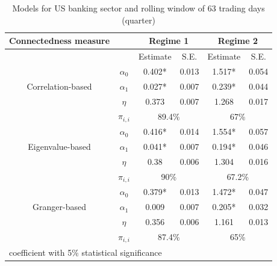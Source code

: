 \documentclass{article}
\begin{document}
\begin{table}
  \caption{Models for US banking sector and rolling window of 63 trading days (quarter)}
  \begin{tabular}{cccccc}
    \toprule
     Connectedness measure &  & \multicolumn{2}{c}{\bfseries Regime 1} & \multicolumn{2}{c}{\bfseries Regime 2}  \\
     \hline
     & & Estimate & S.E. & Estimate & S.E. \\
     \hline
     \multirow{3}{*}[\normalbaselineskip]{Correlation-based} & $\alpha_0$ & 0.402* & 0.013 & 1.517*  & 0.054 \\
      & $\alpha_1$ & 0.027* & 0.007 & 0.239* & 0.044 \\
      & $\eta$ & 0.373 & 0.007 & 1.268 & 0.017 \\
      & $\pi_{i,i}$ &  \multicolumn{2}{c}{89.4\%} & \multicolumn{2}{c}{67\%}\\
      \hline
      \multirow{3}{*}[\normalbaselineskip]{Eigenvalue-based} & $\alpha_0$ & 0.416* & 0.014 & 1.554*  & 0.057 \\
      & $\alpha_1$ & 0.041* & 0.007 & 0.194* & 0.046 \\
      & $\eta$ & 0.38 & 0.006 & 1.304 & 0.016 \\
      & $\pi_{i,i}$ &  \multicolumn{2}{c}{90\%} & \multicolumn{2}{c}{67.2\%}\\
      \hline
      \multirow{3}{*}[\normalbaselineskip]{Granger-based} & $\alpha_0$ & 0.379* & 0.013 & 1.472*  & 0.047 \\
      & $\alpha_1$ & 0.009 & 0.007 & 0.205* & 0.032 \\
      & $\eta$ & 0.356 & 0.006 & 1.161 & 0.013 \\
      & $\pi_{i,i}$ &  \multicolumn{2}{c}{87.4\%} & \multicolumn{2}{c}{65\%}\\
      \hline
    \multicolumn{6}{l}{\footnotesize * coefficient with 5\% statistical significance} \\
    \hline
  \end{tabular}
\end{table}
\end{document}
